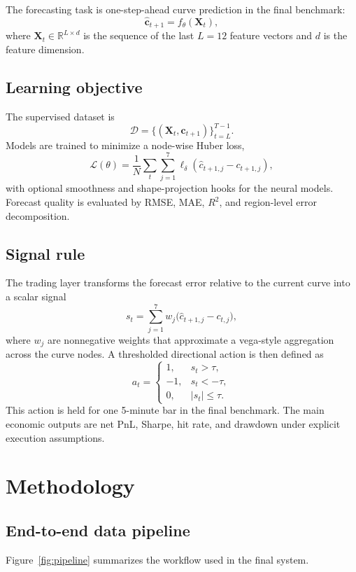 \documentclass[12pt]{report}
\begin{document}
The forecasting task is one-step-ahead curve prediction in the final benchmark:
\[
\hat{\mathbf{c}}_{t+1} = f_\theta(\mathbf{X}_t),
\]
where \(\mathbf{X}_t \in \mathbb{R}^{L \times d}\) is the sequence of the last \(L=12\) feature vectors and \(d\) is the feature dimension.

\section{Learning objective}
The supervised dataset is
\[
\mathcal{D}=\{(\mathbf{X}_t,\mathbf{c}_{t+1})\}_{t=L}^{T-1}.
\]
Models are trained to minimize a node-wise Huber loss,
\[
\mathcal{L}(\theta)=\frac{1}{N}\sum_{t}\sum_{j=1}^{7}\ell_\delta\!\left(\hat{c}_{t+1,j}-c_{t+1,j}\right),
\]
with optional smoothness and shape-projection hooks for the neural models. Forecast quality is evaluated by RMSE, MAE, \(R^2\), and region-level error decomposition.

\section{Signal rule}
The trading layer transforms the forecast error relative to the current curve into a scalar signal
\[
s_t = \sum_{j=1}^{7} w_j\big(\hat{c}_{t+1,j} - c_{t,j}\big),
\]
where \(w_j\) are nonnegative weights that approximate a vega-style aggregation across the curve nodes. A thresholded directional action is then defined as
\[
a_t =
\begin{cases}
1, & s_t > \tau, \\
-1, & s_t < -\tau, \\
0, & |s_t| \le \tau.
\end{cases}
\]
This action is held for one 5-minute bar in the final benchmark. The main economic outputs are net PnL, Sharpe, hit rate, and drawdown under explicit execution assumptions.

\chapter{Methodology}

\section{End-to-end data pipeline}
Figure~\ref{fig:pipeline} summarizes the workflow used in the final system.
\end{document}
